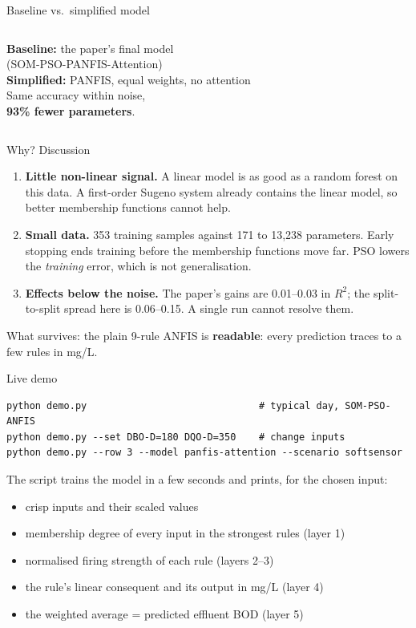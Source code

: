 \documentclass[aspectratio=169,10pt]{beamer}
\newcommand{\tab}[1]{}
\newcommand{\Rsq}{$R^2$}
\begin{document}
\begin{frame}{Baseline vs.\ simplified model}
\begin{columns}[c]
\resizebox{\linewidth}{!}{\tab{summary_baseline_vs_proposed}}
\textbf{Baseline:} the paper's final model\\ (SOM-PSO-PANFIS-Attention)\\[2mm]
\textbf{Simplified:} PANFIS, equal weights, no attention\\[3mm]
Same accuracy within noise,\\ \textbf{93\% fewer parameters}.
\end{columns}
\end{frame}

\begin{frame}{Why? Discussion}
\begin{enumerate}\setlength\itemsep{3mm}
\item \textbf{Little non-linear signal.} A linear model is as good as a random forest on this data. A first-order Sugeno system already contains the linear model, so better membership functions cannot help.
\item \textbf{Small data.} 353 training samples against 171 to 13,238 parameters. Early stopping ends training before the membership functions move far. PSO lowers the \emph{training} error, which is not generalisation.
\item \textbf{Effects below the noise.} The paper's gains are 0.01--0.03 in \Rsq{}; the split-to-split spread here is 0.06--0.15. A single run cannot resolve them.
\end{enumerate}
\vspace{3mm}
What survives: the plain 9-rule ANFIS is \textbf{readable}: every prediction traces to a few rules in mg/L.
\end{frame}

\begin{frame}[fragile]{Live demo}
\small
\begin{verbatim}
python demo.py                              # typical day, SOM-PSO-ANFIS
python demo.py --set DBO-D=180 DQO-D=350    # change inputs
python demo.py --row 3 --model panfis-attention --scenario softsensor
\end{verbatim}
\normalsize
The script trains the model in a few seconds and prints, for the chosen input:
\begin{itemize}
\item crisp inputs and their scaled values
\item membership degree of every input in the strongest rules (layer 1)
\item normalised firing strength of each rule (layers 2--3)
\item the rule's linear consequent and its output in mg/L (layer 4)
\item the weighted average = predicted effluent BOD (layer 5)
\end{itemize}
\end{frame}
\end{document}
